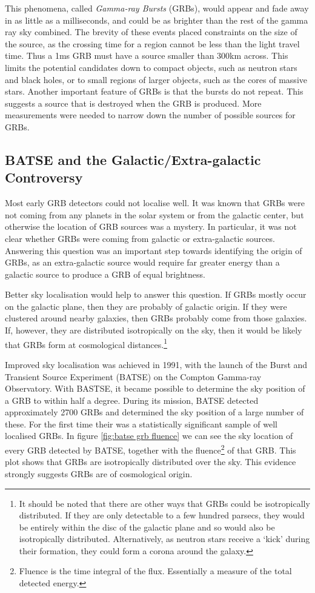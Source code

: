 \documentclass[11pt]{cuthesis}
\begin{document}
This phenomena, called \textit{Gamma-ray Bursts} (GRBs), would appear and fade away in as little as a milliseconds, and could be as brighter than the rest of the gamma ray sky combined. The brevity of these events placed constraints on the size of the source, as the crossing time for a region cannot be less than the light travel time. Thus a 1ms GRB must have a source smaller than 300km across. This limits the potential candidates down to compact objects, such as neutron stars and black holes, or to small regions of larger objects, such as the cores of massive stars. Another important feature of GRBs is that the bursts do not repeat. This suggests a source that is destroyed when the GRB is produced. More measurements were needed to narrow down the number of possible sources for GRBs. 

\subsection{BATSE and the Galactic/Extra-galactic Controversy}
Most early GRB detectors could not localise well. It was known that GRBs were not coming from any planets in the solar system or from the galactic center, but otherwise the location of GRB sources was a mystery. In particular, it was not clear whether GRBs were coming from galactic or extra-galactic sources. Answering this question was an important step towards identifying the origin of GRBs, as an extra-galactic source would require far greater energy than a galactic source to produce a GRB of equal brightness. 

Better sky localisation would help to answer this question. If GRBs mostly occur on the galactic plane, then they are probably of galactic origin. If they were clustered around nearby galaxies, then GRBs probably come from those galaxies. If, however, they are distributed isotropically on the sky, then it would be likely that GRBs form at cosmological distances.\footnote{It should be noted that there are other ways that GRBs could be isotropically distributed. If they are only detectable to a few hundred parsecs, they would be entirely within the disc of the galactic plane and so would also be isotropically distributed. Alternatively, as neutron stars receive a `kick' during their formation, they could form a corona around the galaxy.}

Improved sky localisation was achieved in 1991, with the launch of the Burst and Transient Source Experiment (BATSE) on the Compton Gamma-ray Observatory. With BASTSE, it became possible to determine the sky position of a GRB to within half a degree. During its mission, BATSE detected approximately 2700 GRBs and determined the sky position of a large number of these. For the first time their was a statistically significant sample of well localised GRBs. In figure \ref{fig:batse grb fluence} we can see the sky location of every GRB detected by BATSE, together with the fluence\footnote{Fluence is the time integral of the flux. Essentially a measure of the total detected energy.} of that GRB. This plot shows that GRBs are isotropically distributed over the sky. This evidence strongly suggests GRBs are of cosmological origin. 
\end{document}

